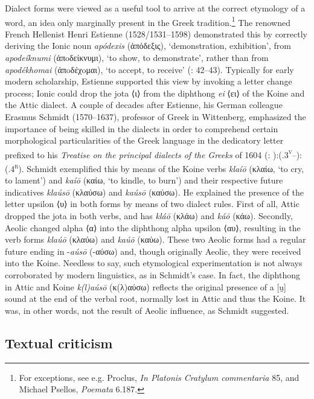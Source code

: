 Dialect forms were viewed as a useful tool to arrive at the correct etymology of a word, an idea only marginally present in the Greek tradition.\footnote{For exceptions, see e.g. Proclus, \textit{In Platonis Cratylum commentaria} 85, and Michael Psellos, \textit{Poemata} 6.187.} The renowned French Hellenist Henri Estienne (1528/1531–1598) demonstrated this by correctly deriving the Ionic noun \textit{apódexis} (ἀπόδεξις), ‘demonstration, exhibition’, from \textit{apodeíknumi} (ἀπoδείκνυμι), ‘to show, to demonstrate’, rather than from \textit{apodékhomai} (ἀπoδέχoμαι), ‘to accept, to receive’ (\citealt{Estienne1581}: 42–43). Typically for early modern scholarship, Estienne supported this view by invoking a letter change process; Ionic could drop the jota ⟨ι⟩ from the diphthong \textit{ei} ⟨ει⟩ of the Koine and the Attic dialect. A couple of decades after Estienne, his German colleague Erasmus Schmidt (1570–1637), professor of Greek in Wittenberg, emphasized the importance of being skilled in the dialects in order to comprehend certain morphological particularities of the Greek language in the dedicatory letter prefixed to his \textit{Treatise on the principal dialects of the Greeks} of 1604 (\citealt{Schmidt1604}: ):(.3\textsc{\textsuperscript{v}}–):(.4\textsc{\textsuperscript{r}}). Schmidt exemplified this by means of the Koine verbs \textit{klaíō} (κλαίω, ‘to cry, to lament’) and \textit{kaíō} (καίω, ‘to kindle, to burn’) and their respective future indicatives \textit{klaúsō} (κλαύσω) and \textit{kaúsō} (καύσω). He explained the presence of the letter upsilon ⟨υ⟩ in both forms by means of two dialect rules. First of all, Attic dropped the jota in both verbs, and has \textit{kláō} (κλάω) and \textit{káō} (κάω). Secondly, Aeolic changed alpha ⟨α⟩ into the diphthong alpha upsilon ⟨αυ⟩, resulting in the verb forms \textit{klaúō} (κλαύω) and \textit{kaúō} (καύω). These two Aeolic forms had a regular future ending in -\textit{aúsō} (-αύσω) and, though originally Aeolic, they were received into the Koine. Needless to say, such etymological experimentation is not always corroborated by modern linguistics, as in Schmidt’s case.{} In fact, the diphthong in Attic and Koine \textit{k(l)aúsō} (κ(λ)αύσω) reflects the original presence of a [u̯] sound at the end of the verbal root, normally lost in Attic and thus the Koine. It was, in other words, not the result of Aeolic influence, as Schmidt suggested.

\subsection{Textual criticism}

